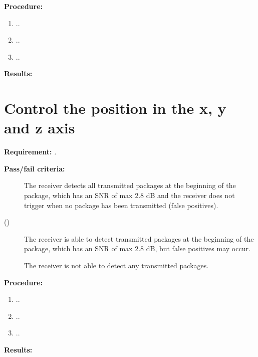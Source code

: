 		
\textbf{Procedure:}\\


\begin{enumerate}
	\item ..
	\item ..
	\item ..
\end{enumerate} 


\textbf{Results:}


\newpage

\section{Control the position in the x, y and z axis}
\textbf{Requirement: }
\textit{.}

\textbf{Pass/fail criteria:}
	\begin{description}
	\item[  ] The receiver detects all transmitted packages at the beginning of the package, which has an SNR of max 2.8 dB and the receiver does not trigger when no package has been transmitted (false positives).
	\item[()]The receiver is able to detect transmitted packages at the beginning of the package, which has an SNR of max 2.8 dB, but false positives may occur.
	\item[  \phantom{)}]The receiver is not able to detect any transmitted packages.
	\end{description}

		
\textbf{Procedure:}\\


\begin{enumerate}
	\item ..
	\item ..
	\item ..
\end{enumerate} 


\textbf{Results:}

\newpage
